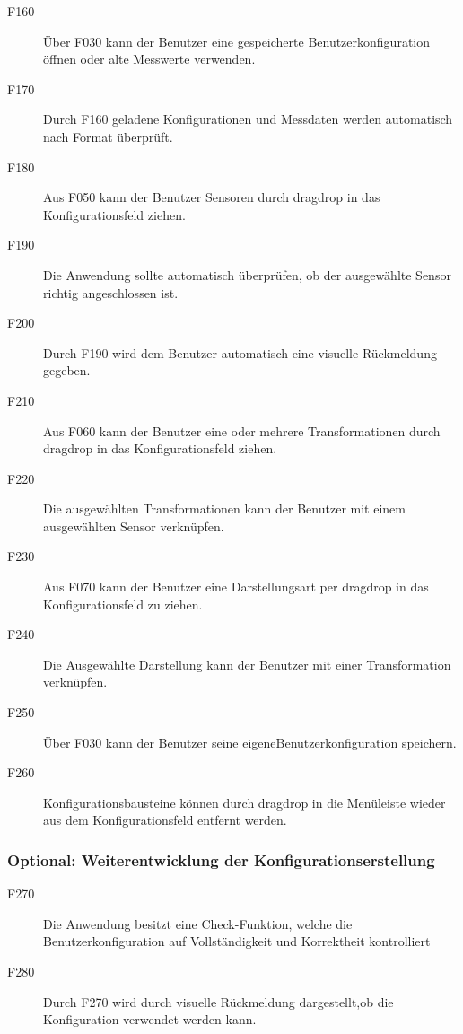 \documentclass[parskip=full]{scrartcl}
\begin{document}
\begin{description}

\item[F160] Über F030 kann der Benutzer eine gespeicherte \gls{Benutzerkonfiguration} öffnen oder alte Messwerte verwenden.
\item[F170] Durch F160 geladene Konfigurationen und Messdaten werden automatisch nach Format überprüft.
\item[F180] Aus F050 kann der Benutzer Sensoren durch \gls{dragdrop} in das Konfigurationsfeld ziehen.
\item[F190] Die Anwendung sollte automatisch überprüfen, ob der ausgewählte Sensor richtig angeschlossen ist.
\item[F200] Durch F190 wird dem Benutzer automatisch eine visuelle Rückmeldung gegeben.
\item[F210] Aus F060 kann der Benutzer eine oder mehrere Transformationen durch \gls{dragdrop} in das Konfigurationsfeld ziehen.
\item[F220] Die ausgewählten Transformationen kann der Benutzer mit einem ausgewählten Sensor verknüpfen.
\item[F230] Aus F070 kann der Benutzer eine Darstellungsart per \gls{dragdrop} in das Konfigurationsfeld zu ziehen.
\item[F240] Die Ausgewählte Darstellung kann der Benutzer mit einer Transformation verknüpfen.
\item[F250] Über F030 kann der Benutzer seine eigene\gls{Benutzerkonfiguration} speichern.
\item[F260] Konfigurationsbausteine können durch \gls{dragdrop} in die Menüleiste wieder aus dem Konfigurationsfeld entfernt werden.

\end{description}

\subsubsection{Optional: Weiterentwicklung der Konfigurationserstellung}

\begin{description}

\item[F270] Die Anwendung besitzt eine Check-Funktion, welche die \gls{Benutzerkonfiguration} auf Vollständigkeit und Korrektheit kontrolliert
\item[F280] Durch F270 wird durch visuelle Rückmeldung dargestellt,ob die Konfiguration verwendet werden kann.

\end{description}
\end{document}
